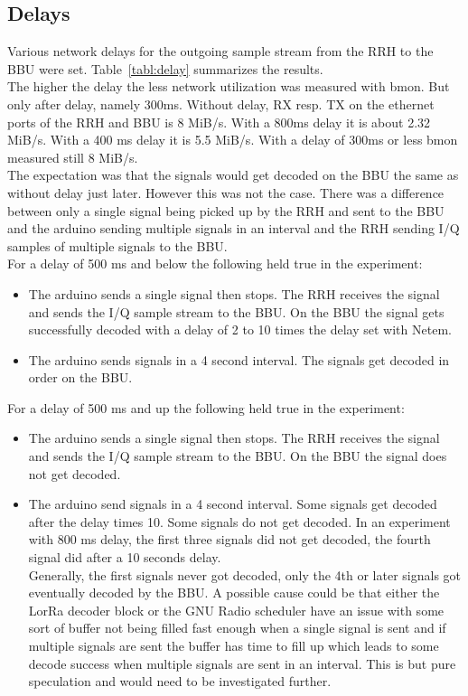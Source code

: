 \subsection{Delays}
Various network delays for the outgoing sample stream from the RRH to the BBU were set.
Table~\ref{tabl:delay} summarizes the results.
\\
The higher the delay the less network utilization was measured with bmon. But only after delay,
namely 300ms. Without delay, RX resp. TX on the ethernet ports of the RRH and BBU is 8 MiB/s.
With a 800ms delay it is about 2.32 MiB/s. With a 400 ms delay it is 5.5 MiB/s. With a delay 
of 300ms or less bmon measured still 8 MiB/s.
\\
The expectation was that the signals would get decoded on the BBU the same as without delay just later.
However this was not the case. There was a difference between only a single signal being picked up by the RRH and sent 
to the BBU and the arduino sending multiple signals in an interval and the RRH sending I/Q samples of multiple signals 
to the BBU.
\\
For a delay of 500 ms and below the following held true in the experiment:
\\
\begin{itemize}
    \item The arduino sends a single signal then stops. The RRH receives the signal and sends the I/Q sample stream
    to the BBU. On the BBU the signal gets successfully decoded with a delay of 2 to 10 times the delay set with Netem.
    \item The arduino sends signals in a 4 second interval. The signals get decoded in order on the BBU.
\end{itemize}


For a delay of 500 ms and up the following held true in the experiment:
\\
\begin{itemize}
    \item The arduino sends a single signal then stops. The RRH receives the signal and sends the I/Q sample stream 
    to the BBU. On the BBU the signal does not get decoded.
    \item The arduino send signals in a 4 second interval. Some signals get decoded after the delay times 10. Some signals do not get decoded.
    In an experiment with 800 ms delay,  the first three signals did not get decoded, the fourth signal did after a 10 seconds delay. \\
    Generally, the first signals never got decoded, only the 4th or later signals got eventually decoded by the BBU.
    A possible cause could be that either the LorRa decoder block or the GNU Radio scheduler have an issue 
    with some sort of buffer not being filled fast enough when a single signal is sent and if multiple signals are sent 
    the buffer has time to fill up which leads to some decode success when multiple signals are sent in an interval.
    This is but pure speculation and would need to be investigated further.

\end{itemize}


